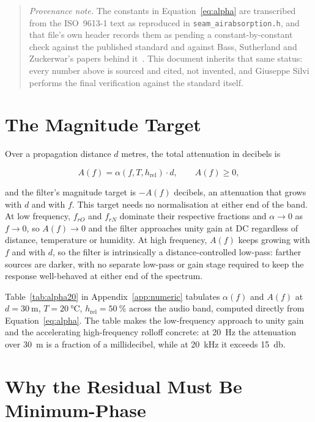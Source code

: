 \documentclass[11pt,a4paper]{article}
\begin{document}
\begin{quote}
\textit{Provenance note.}
The constants in Equation~\eqref{eq:alpha} are transcribed from the ISO~9613-1 text as reproduced in \texttt{seam\_airabsorption.h}, and that file's own header records them as pending a constant-by-constant check against the published standard and against Bass, Sutherland and Zuckerwar's papers behind it~\cite{BassSutherlandZuckerwar1990,BassEtAl1995}.
This document inherits that same status: every number above is sourced and cited, not invented, and Giuseppe Silvi performs the final verification against the standard itself.
\end{quote}

\section{The Magnitude Target}
\label{sec:target}

Over a propagation distance $d$ metres, the total attenuation in decibels is

\begin{equation}
A(f) = \alpha(f,T,h_\text{rel}) \cdot d ,
\qquad
A(f) \ge 0 ,
\end{equation}

and the filter's magnitude target is $-A(f)$ decibels, an attenuation that grows with $d$ and with $f$.
This target needs no normalisation at either end of the band.
At low frequency, $f_{rO}$ and $f_{rN}$ dominate their respective fractions and $\alpha \to 0$ as $f \to 0$, so $A(f) \to 0$ and the filter approaches unity gain at DC regardless of distance, temperature or humidity.
At high frequency, $A(f)$ keeps growing with $f$ and with $d$, so the filter is intrinsically a distance-controlled low-pass: farther sources are darker, with no separate low-pass or gain stage required to keep the response well-behaved at either end of the spectrum.

Table~\ref{tab:alpha20} in Appendix~\ref{app:numeric} tabulates $\alpha(f)$ and $A(f)$ at $d=\SI{30}{\meter}$, $T=\SI{20}{\celsius}$, $h_\text{rel}=\SI{50}{\percent}$ across the audio band, computed directly from Equation~\eqref{eq:alpha}.
The table makes the low-frequency approach to unity gain and the accelerating high-frequency rolloff concrete: at \SI{20}{\hertz} the attenuation over \SI{30}{\meter} is a fraction of a millidecibel, while at \SI{20}{\kilo\hertz} it exceeds \SI{15}{\decibel}.

\section{Why the Residual Must Be Minimum-Phase}
\label{sec:minphase}
\end{document}
